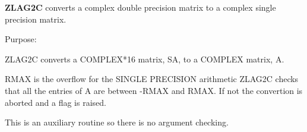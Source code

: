 {\bfseries Z\+L\+A\+G2\+C} converts a complex double precision matrix to a complex single precision matrix. 

 \begin{DoxyParagraph}{Purpose\+: }
\begin{DoxyVerb} ZLAG2C converts a COMPLEX*16 matrix, SA, to a COMPLEX matrix, A.

 RMAX is the overflow for the SINGLE PRECISION arithmetic
 ZLAG2C checks that all the entries of A are between -RMAX and
 RMAX. If not the convertion is aborted and a flag is raised.

 This is an auxiliary routine so there is no argument checking.\end{DoxyVerb}
 
\end{DoxyParagraph}

